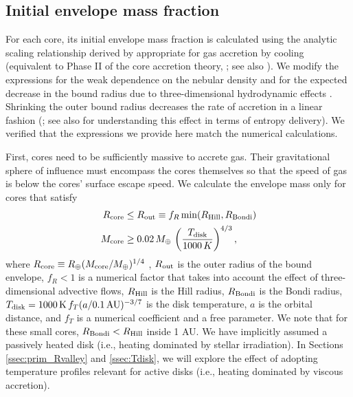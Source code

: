 \documentclass[twocolumn]{aastex63}
\begin{document}
\subsection{Initial envelope mass fraction}
\label{ssec:init}

For each core, its initial envelope mass fraction is calculated using the analytic scaling relationship derived by \citet{Lee15} appropriate for gas accretion by cooling (equivalent to Phase II of the core accretion theory, \citealt{Pollack96}; see also \citealt{Ginzburg16}). We modify the expressions for the weak dependence on the nebular density \citep{Lee16} and for the expected decrease in the bound radius due to three-dimensional hydrodynamic effects \citep{Lambrechts17,Fung19}. Shrinking the outer bound radius decreases the rate of accretion in a linear fashion (\citealt{Lee14}; see also \citealt{Alidib20} for understanding this effect in terms of entropy delivery). We verified that the expressions we provide here match the numerical calculations. 

First, cores need to be sufficiently massive to accrete gas. Their gravitational sphere of influence must encompass the cores themselves so that the speed of gas is below the cores' surface escape speed. We calculate the envelope mass only for cores that satisfy
%
\begin{align}
    R_{\rm core} &\leq R_{\rm out} \equiv f_R\,{\rm min}(R_{\rm Hill}, R_{\rm Bondi}) \nonumber \\
    M_{\rm core} &\geq 0.02\,M_\oplus\,\left(\frac{T_{\rm disk}}{1000\,K}\right)^{4/3},
\end{align}
%
where $R_{\rm core} \equiv R_\oplus (M_{\rm core}/M_\oplus)^{1/4}$ \citep{Valencia06}, $R_{\rm out}$ is the outer radius of the bound envelope, $f_R < 1$ is a numerical factor that takes into account the effect of three-dimensional advective flows, $R_{\rm Hill}$ is the Hill radius, $R_{\rm Bondi}$ is the Bondi radius, $T_{\rm disk} = 1000\,{\rm K}\,f_T(a/0.1\,{\rm AU})^{-3/7}$ is the disk temperature, $a$ is the orbital distance, and $f_T$ is a numerical coefficient and a free parameter. We note that for these small cores, $R_{\rm Bondi} < R_{\rm Hill}$ inside 1 AU. We have implicitly assumed a passively heated disk (i.e., heating dominated by stellar irradiation). In Sections \ref{ssec:prim_Rvalley} and \ref{ssec:Tdisk}, we will explore the effect of adopting temperature profiles relevant for active disks (i.e., heating dominated by viscous accretion).
\end{document}

